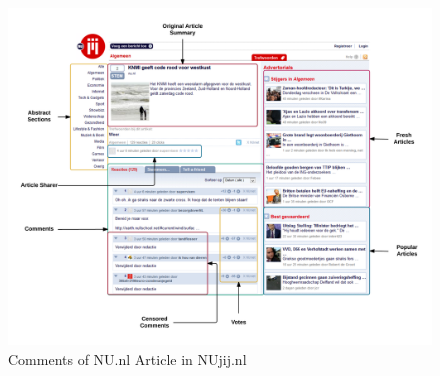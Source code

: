 \begin{figure}
\centering
\includegraphics[width=1\textwidth]{app_images/nu_3.png}
\caption{Comments of NU.nl Article in NUjij.nl}
\label{fig:nu_3}
\end{figure}